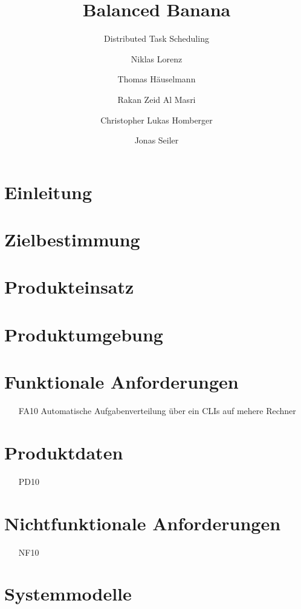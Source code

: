 \documentclass[parskip=full]{scrartcl}
\title{Balanced Banana}
\subtitle{Distributed Task Scheduling}
\author{Niklas Lorenz \and Thomas Häuselmann \and Rakan Zeid Al Masri \and Christopher Lukas Homberger \and Jonas Seiler}
\begin{document}
\maketitle

\section{Einleitung}

\section{Zielbestimmung}

\section{Produkteinsatz}

\section{Produktumgebung}

\section{Funktionale Anforderungen}
\begin{itemize}[nosep]
\item[FA10] Automatische Aufgabenverteilung über ein \glspl{CLI} auf mehere Rechner
\end{itemize}

\section{Produktdaten}
\begin{itemize}[nosep]
\item[PD10]
\end{itemize}

\section{Nichtfunktionale Anforderungen}
\begin{itemize}[nosep]
\item[NF10]
\end{itemize}

\section{Systemmodelle}
\end{document}
